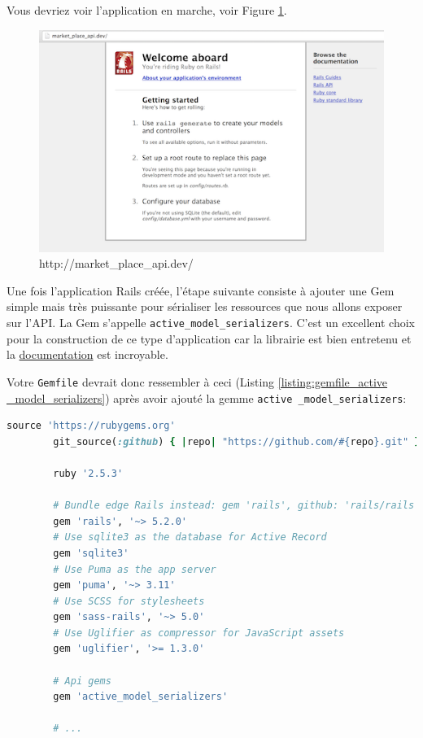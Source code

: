 \documentclass[]{report}
\begin{document}
        Vous devriez voir l'application en marche, voir Figure \ref{fig:pow_running}.

        \begin{figure}
          \includegraphics[width=\linewidth]{img/pow_running.png}
          \caption{http://market\_place\_api.dev/}
          \label{fig:pow_running}
        \end{figure}

        Une fois l'application Rails créée, l'étape suivante consiste à ajouter une Gem simple mais très puissante pour sérialiser les ressources que nous allons exposer sur l'API. La Gem s'appelle \verb|active_model_serializers|. C'est un excellent choix pour la construction de ce type d'application car la librairie est bien entretenu et la \href{https://github.com/rails-api/active_model_serializers}{documentation} est incroyable.

        Votre \verb|Gemfile| devrait donc ressembler à ceci (Listing \ref{listing:gemfile_active _model_serializers}) après avoir ajouté la gemme \verb|active _model_serializers|:


        \begin{scriptsize}
        \begin{lstlisting}[language=ruby, caption={Le Gemfile par défaut avec la Gem des sérialiseurs.}, label={listing:gemfile_active _model_serializers}, breaklines]
        source 'https://rubygems.org'
        git_source(:github) { |repo| "https://github.com/#{repo}.git" }

        ruby '2.5.3'

        # Bundle edge Rails instead: gem 'rails', github: 'rails/rails'
        gem 'rails', '~> 5.2.0'
        # Use sqlite3 as the database for Active Record
        gem 'sqlite3'
        # Use Puma as the app server
        gem 'puma', '~> 3.11'
        # Use SCSS for stylesheets
        gem 'sass-rails', '~> 5.0'
        # Use Uglifier as compressor for JavaScript assets
        gem 'uglifier', '>= 1.3.0'

        # Api gems
        gem 'active_model_serializers'

        # ...
        \end{lstlisting}
        \end{scriptsize}
\end{document}
